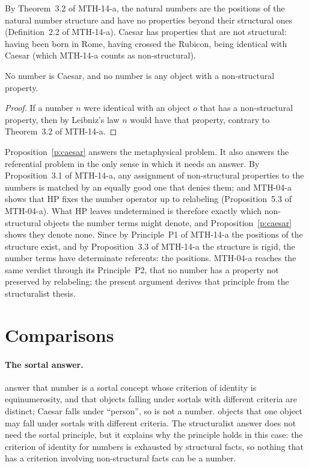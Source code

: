 \documentclass{situationist-preprint}
\begin{document}
By Theorem~3.2 of MTH-14-a, the natural numbers are the positions of the natural number structure and have no properties beyond their structural ones (Definition~2.2 of MTH-14-a). Caesar has properties that are not structural: having been born in Rome, having crossed the Rubicon, being identical with Caesar (which MTH-14-a counts as non-structural).

\begin{proposition}\label{p:caesar}
No number is Caesar, and no number is any object with a non-structural property.
\end{proposition}

\begin{proof}
If a number $n$ were identical with an object $o$ that has a non-structural property, then by Leibniz's law $n$ would have that property, contrary to Theorem~3.2 of MTH-14-a.
\end{proof}

Proposition~\ref{p:caesar} answers the metaphysical problem. It also answers the referential problem in the only sense in which it needs an answer. By Proposition~3.1 of MTH-14-a, any assignment of non-structural properties to the numbers is matched by an equally good one that denies them; and MTH-04-a shows that HP fixes the number operator up to relabeling (Proposition~5.3 of MTH-04-a). What HP leaves undetermined is therefore exactly which non-structural objects the number terms might denote, and Proposition~\ref{p:caesar} shows they denote none. Since by Principle~P1 of MTH-14-a the positions of the structure exist, and by Proposition~3.3 of MTH-14-a the structure is rigid, the number terms have determinate referents: the positions. MTH-04-a reaches the same verdict through its Principle~P2, that no number has a property not preserved by relabeling; the present argument derives that principle from the structuralist thesis.

\section{Comparisons}

\paragraph{The sortal answer.} \citet[ch.~14]{HaleWright2001} answer that number is a sortal concept whose criterion of identity is equinumerosity, and that objects falling under sortals with different criteria are distinct; Caesar falls under \enquote{person}, so is not a number. \citet{MacBride2003} objects that one object may fall under sortals with different criteria. The structuralist answer does not need the sortal principle, but it explains why the principle holds in this case: the criterion of identity for numbers is exhausted by structural facts, so nothing that has a criterion involving non-structural facts can be a number.
\end{document}
